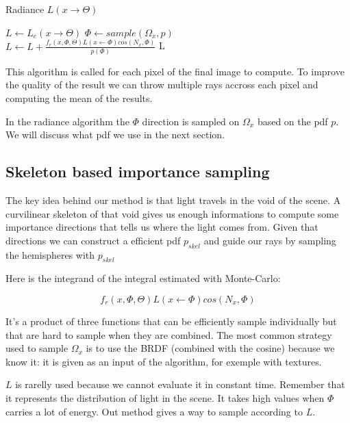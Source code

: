 \begin{algorithm}[h!]
\label{algo::radiance}
\caption[radiance]{Radiance $L(x \rightarrow \Theta)$}
$L \gets L_e(x \rightarrow \Theta)$\;
 {
	$\Phi \gets sample(\Omega_x, p)$ \\
	$L \gets L + \frac{f_r(x, \Phi, \Theta) L(x \leftarrow \Phi) cos(N_x, \Phi)}{p(\Phi)}$\;
}
\Return L\;
\end{algorithm}

This algorithm is called for each pixel of the final image to compute. To improve the quality of the result we can throw multiple rays accross each pixel and computing the mean of the results.

In the radiance algorithm the $\Phi$ direction is sampled on $\Omega_x$ based on the pdf $p$. We will discuss what pdf we use in the next section.

\subsection{Skeleton based importance sampling}

The key idea behind our method is that light travels in the void of the scene. A curvilinear skeleton of that void gives us enough informations to compute some importance directions that tells us where the light comes from. Given that directions we can construct a efficient pdf $p_{skel}$ and guide our rays by sampling the hemispheres with $p_{skel}$

Here is the integrand of the integral estimated with Monte-Carlo:

\begin{equation*}
f_r(x, \Phi, \Theta) L(x \leftarrow \Phi) cos(N_x, \Phi)
\end{equation*}

It's a product of three functions that can be efficiently sample individually but that are hard to sample when they are combined. The most common strategy used to sample $\Omega_x$ is to use the BRDF (combined with the cosine) because we know it: it is given as an input of the algorithm, for exemple with textures.

$L$ is rarelly used because we cannot evaluate it in constant time. Remember that it represents the distribution of light in the scene. It takes high values when $\Phi$ carries a lot of energy. Out method gives a way to sample according to $L$.

